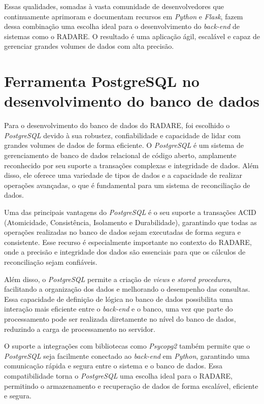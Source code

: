 Essas qualidades, somadas à vasta comunidade de desenvolvedores que continuamente aprimoram e documentam recursos em \textit{Python} e \textit{Flask}, fazem dessa combinação uma escolha ideal para o desenvolvimento do \textit{back-end} de sistemas como o RADARE. O resultado é uma aplicação ágil, escalável e capaz de gerenciar grandes volumes de dados com alta precisão.
    
\section{Ferramenta PostgreSQL no desenvolvimento do banco de dados}

Para o desenvolvimento do banco de dados do RADARE, foi escolhido o \textit{PostgreSQL} devido à sua robustez, confiabilidade e capacidade de lidar com grandes volumes de dados de forma eficiente. O \textit{PostgreSQL} é um sistema de gerenciamento de banco de dados relacional de código aberto, amplamente reconhecido por seu suporte a transações complexas e integridade de dados. Além disso, ele oferece uma variedade de tipos de dados e a capacidade de realizar operações avançadas, o que é fundamental para um sistema de reconciliação de dados.

Uma das principais vantagens do \textit{PostgreSQL} é o seu suporte a transações ACID (Atomicidade, Consistência, Isolamento e Durabilidade), garantindo que todas as operações realizadas no banco de dados sejam executadas de forma segura e consistente. Esse recurso é especialmente importante no contexto do RADARE, onde a precisão e integridade dos dados são essenciais para que os cálculos de reconciliação sejam confiáveis.

Além disso, o \textit{PostgreSQL} permite a criação de \textit{views} e \textit{stored procedures}, facilitando a organização dos dados e melhorando o desempenho das consultas. Essa capacidade de definição de lógica no banco de dados possibilita uma interação mais eficiente entre o \textit{back-end} e o banco, uma vez que parte do processamento pode ser realizada diretamente no nível do banco de dados, reduzindo a carga de processamento no servidor.

O suporte a integrações com bibliotecas como \textit{Psycopg2} também permite que o \textit{PostgreSQL} seja facilmente conectado ao \textit{back-end} em \textit{Python}, garantindo uma comunicação rápida e segura entre o sistema e o banco de dados. Essa compatibilidade torna o \textit{PostgreSQL} uma escolha ideal para o RADARE, permitindo o armazenamento e recuperação de dados de forma escalável, eficiente e segura.
   
